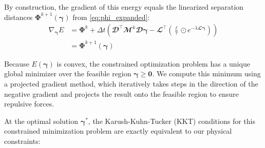 \documentclass[conference]{IEEEtran}
\begin{document}
By construction, the gradient of this energy equals the linearized separation distances $\mathbf{\Phi}^{k+1}(\boldsymbol{\gamma})$ from \autoref{eq:phi_expanded}:
{\small
\begin{equation}
    \begin{split}
        \nabla_{\boldsymbol{\gamma}} E & = \boldsymbol{\Phi}^k + \Delta t \left( \mathbfcal{D}^\top \mathbfcal{M}^k \mathbfcal{D} \boldsymbol{\gamma} - \mathbfcal{L}^\top \left( \frac{\boldsymbol{\ell}}{\tau} \odot e^{-\lambda \mathbfcal{L} \boldsymbol{\gamma}} \right)  \right) \\
        & = \boldsymbol{\Phi}^{k+1}(\boldsymbol{\gamma})
    \end{split}
\end{equation}
}

Because $E(\boldsymbol{\gamma})$ is convex, the constrained optimization problem has a unique global minimizer over the feasible region $\boldsymbol{\gamma} \geq \mathbf{0}$. We compute this minimum using a projected gradient method, which iteratively takes steps in the direction of the negative gradient and projects the result onto the feasible region to ensure repulsive forces.

At the optimal solution $\boldsymbol{\gamma}^*$, the Karush-Kuhn-Tucker (KKT) conditions for this constrained minimization problem are exactly equivalent to our physical constraints:
\end{document}
